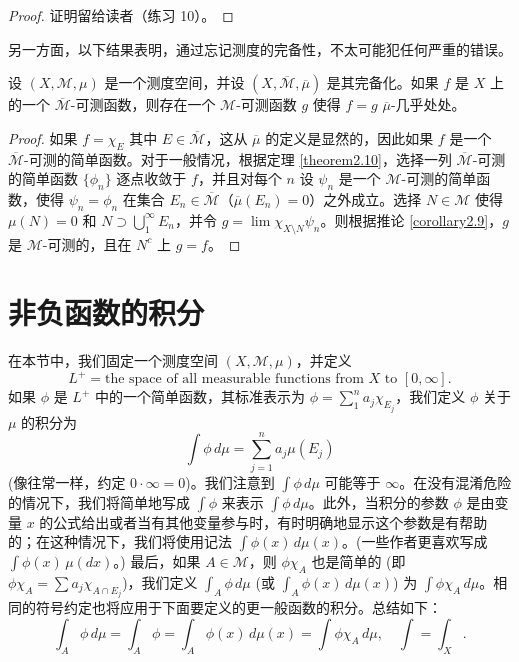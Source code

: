 \documentclass[lang=cn,10pt,thmcnt=section]{elegantbook}
\begin{document}
\begin{proof}
证明留给读者（练习 10）。
\end{proof}

另一方面，以下结果表明，通过忘记测度的完备性，不太可能犯任何严重的错误。

\begin{proposition}\label{proposition2.12}	
设 $(X, \mathcal{M}, \mu)$ 是一个测度空间，并设 $(X, \overline{\mathcal{M}}, \overline{\mu})$ 是其完备化。如果 $f$ 是 $X$ 上的一个 $\overline{\mathcal{M}}$-可测函数，则存在一个 $\mathcal{M}$-可测函数 $g$ 使得 $f=g$ $\overline{\mu}$-几乎处处。
\end{proposition}

\begin{proof}
如果 $f = \chi_E$ 其中 $E \in \overline{\mathcal{M}}$，这从 $\overline{\mu}$ 的定义是显然的，因此如果 $f$ 是一个 $\overline{\mathcal{M}}$-可测的简单函数。对于一般情况，根据定理 \ref{theorem2.10}，选择一列 $\overline{\mathcal{M}}$-可测的简单函数 $\{\phi_n\}$ 逐点收敛于 $f$，并且对每个 $n$ 设 $\psi_n$ 是一个 $\mathcal{M}$-可测的简单函数，使得 $\psi_n = \phi_n$ 在集合 $E_n \in \overline{\mathcal{M}}$（$\overline{\mu}(E_n)=0$）之外成立。选择 $N \in \mathcal{M}$ 使得 $\mu(N)=0$ 和 $N \supset \bigcup_1^\infty E_n$，并令 $g = \lim \chi_{X \setminus N} \psi_n$。则根据推论 \ref{corollary2.9}，$g$ 是 $\mathcal{M}$-可测的，且在 $N^c$ 上 $g=f$。
\end{proof}
\section{非负函数的积分}
在本节中，我们固定一个测度空间 $(X, \mathcal{M}, \mu)$，并定义
\[ L^+ = \text{the space of all measurable functions from } X \text{ to } [0, \infty]. \]
如果 $\phi$ 是 $L^+$ 中的一个简单函数，其标准表示为 $\phi = \sum_{1}^{n} a_j \chi_{E_j}$，我们定义 $\phi$ 关于 $\mu$ 的积分为
\[ \int \phi \,d\mu = \sum_{j=1}^{n} a_j \mu(E_j) \]
(像往常一样，约定 $0 \cdot \infty = 0$)。我们注意到 $\int \phi \,d\mu$ 可能等于 $\infty$。在没有混淆危险的情况下，我们将简单地写成 $\int \phi$ 来表示 $\int \phi \,d\mu$。此外，当积分的参数 $\phi$ 是由变量 $x$ 的公式给出或者当有其他变量参与时，有时明确地显示这个参数是有帮助的；在这种情况下，我们将使用记法 $\int \phi(x) \,d\mu(x)$。(一些作者更喜欢写成 $\int \phi(x) \,\mu(dx)$。) 最后，如果 $A \in \mathcal{M}$，则 $\phi \chi_A$ 也是简单的 (即 $\phi \chi_A = \sum a_j \chi_{A \cap E_j}$)，我们定义 $\int_A \phi \,d\mu$ (或 $\int_A \phi(x) \,d\mu(x)$) 为 $\int \phi \chi_A \,d\mu$。相同的符号约定也将应用于下面要定义的更一般函数的积分。总结如下：
\[ \int_A \phi \,d\mu = \int_A \phi = \int_A \phi(x) \,d\mu(x) = \int \phi \chi_A \,d\mu, \quad \int = \int_X. \]
\end{document}
